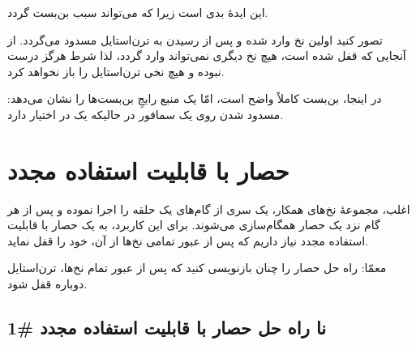 \documentclass{book}
\newcommand{\clearemptydoublepage}{\newpage\cleardoublepage}
\begin{document}
    این ایدهٔ بدی است زیرا که می‌تواند سبب بن‌بست گردد. 

    تصور کنید اولین نخ وارد  شده و پس از رسیدن به تر‌ن‌استایل مسدود می‌گردد. 
    از آنجایی که  قفل شده است، هیچ نخ دیگری نمی‌تواند وارد گردد، لذا شرط 
     هرگز درست نبوده و هیچ نخی ترن‌استایل را باز نخواهد کرد. 

    در اینجا، بن‌بست کاملاً واضح است، امّا یک منبع رایجِ بن‌بست‌ها را نشان می‌دهد: مسدود شدن روی یک سمافور در حالیکه یک 
      در اختیار دارد. 

\section {حصار با قابلیت استفاده مجدد}
\label{rebar}

    اغلب، مجموعهٔ نخ‌های همکار، یک سری از گام‌های یک حلقه را اجرا نموده و پس از هر گام نزد یک حصار همگام‌سازی می‌شوند.
    برای این کاربرد، به یک حصار با قابلیت استفاده مجدد نیاز داریم که پس از عبور تمامی نخ‌ها از آن، خود را قفل نماید.  

    معمّا: راه حل حصار را چنان بازنویسی کنید که پس از عبور تمام نخ‌ها، ترن‌استایل دوباره قفل شود.

\clearemptydoublepage
\subsection{ نا راه حل حصار با قابلیت استفاده مجدد  \#1}
\end{document}
